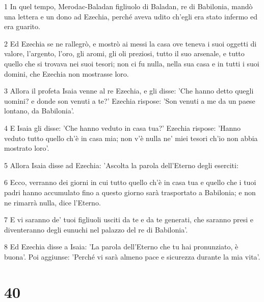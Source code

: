 \par 1 In quel tempo, Merodac-Baladan figliuolo di Baladan, re di Babilonia, mandò una lettera e un dono ad Ezechia, perché aveva udito ch'egli era stato infermo ed era guarito.
\par 2 Ed Ezechia se ne rallegrò, e mostrò ai messi la casa ove teneva i suoi oggetti di valore, l'argento, l'oro, gli aromi, gli oli preziosi, tutto il suo arsenale, e tutto quello che si trovava nei suoi tesori; non ci fu nulla, nella sua casa e in tutti i suoi domini, che Ezechia non mostrasse loro.
\par 3 Allora il profeta Isaia venne al re Ezechia, e gli disse: 'Che hanno detto quegli uomini? e donde son venuti a te?' Ezechia rispose: 'Son venuti a me da un paese lontano, da Babilonia'.
\par 4 E Isaia gli disse: 'Che hanno veduto in casa tua?' Ezechia rispose: 'Hanno veduto tutto quello ch'è in casa mia; non v'è nulla ne' miei tesori ch'io non abbia mostrato loro'.
\par 5 Allora Isaia disse ad Ezechia: 'Ascolta la parola dell'Eterno degli eserciti:
\par 6 Ecco, verranno dei giorni in cui tutto quello ch'è in casa tua e quello che i tuoi padri hanno accumulato fino a questo giorno sarà trasportato a Babilonia; e non ne rimarrà nulla, dice l'Eterno.
\par 7 E vi saranno de' tuoi figliuoli usciti da te e da te generati, che saranno presi e diventeranno degli eunuchi nel palazzo del re di Babilonia'.
\par 8 Ed Ezechia disse a Isaia: 'La parola dell'Eterno che tu hai pronunziato, è buona'. Poi aggiunse: 'Perché vi sarà almeno pace e sicurezza durante la mia vita'.

\chapter{40}

